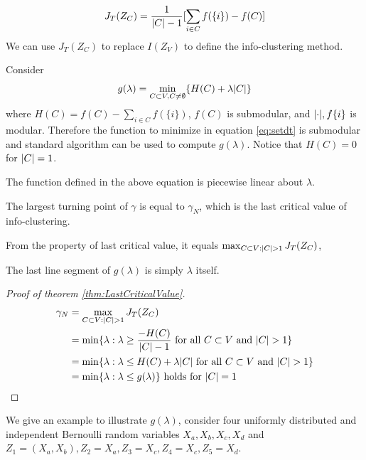 \documentclass{article}
\begin{document}
\begin{equation}
J_T(Z_C) = \frac{1}{\lvert C\rvert-1} [\sum_{i\in C} f(\{i\}) - f(C)]
\end{equation}
We can use $J_T(Z_C)$ to replace $I(Z_V)$ to define the info-clustering method.

Consider
\begin{equation}\label{eq:setdt}
g(\lambda) = \min_{C\subset V, C\neq \emptyset} \{ H(C) + \lambda\lvert C\rvert\}
\end{equation}
where $H(C) = f(C) - \sum_{i\in C} f(\{i\})$, $f(C)$ is submodular, and $\lvert\cdot\rvert, f\{i\}$ is modular.
Therefore the function to minimize in equation \eqref{eq:setdt} is submodular and standard algorithm can be
used to compute $g(\lambda)$.
Notice that $H(C)=0$ for $\lvert C\rvert=1$.

The function defined in the above equation is piecewise linear about $\lambda$.
\begin{theorem}\label{thm:LastCriticalValue}
The largest turning point of $\gamma$ is equal to $\gamma_N$, which is the last critical value of info-clustering.
\end{theorem}
From the property of last critical value, it equals $\max_{C\subset V: \lvert C\rvert>1}J_T(Z_C)$,


The last line segment of $g(\lambda)$ is simply $\lambda$ itself.
\begin{proof}[Proof of theorem \ref{thm:LastCriticalValue}]
\begin{align*}
\gamma_N & = \max_{C\subset V: \lvert C\rvert>1} J_T(Z_C) \\
& = \min\{\lambda : \lambda \geq \frac{-H(C)}{\lvert C\rvert-1} \textrm{ for all $C\subset V$ and $\lvert C\rvert>1$}\} \\
& = \min\{\lambda : \lambda \leq H(C)+\lambda\lvert C\rvert \textrm{ for all $C\subset V$ and $\lvert C\rvert>1$}\} \\
& = \min\{\lambda : \lambda \leq g(\lambda) \} \textrm{ holds for } \lvert C\rvert=1
\end{align*}
\end{proof}

We give an example to illustrate $g(\lambda)$, consider four
uniformly distributed and independent Bernoulli random variables $X_a, X_b, X_c, X_d$ and $
Z_1 = (X_a, X_b), Z_2 = X_a, Z_3 = X_c, Z_4 = X_c, Z_5 = X_d$.
\end{document}
